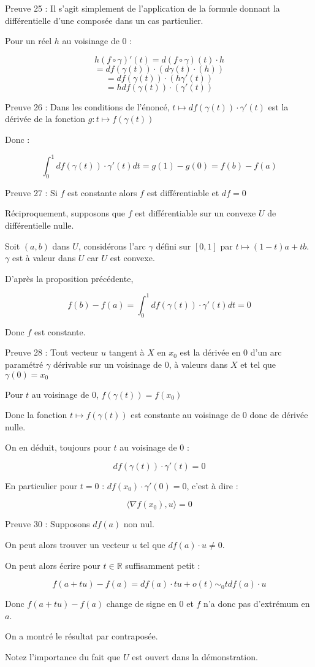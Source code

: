\documentclass[a4paper,12pt]{book}
\newcommand{\Pre}[1]{\begin{tcolorbox}[sharp corners, colback=white,colframe=green!60!green!30!black!75, title=Preuve]#1\end{tcolorbox}}
\def\R{\mathbb{R}}
\begin{document}
\Pre{Preuve 25 : Il s'agit simplement de l'application de la formule donnant la différentielle d'une composée dans un cas particulier.
\par Pour un réel $h$ au voisinage de $0$ :
\par $$h(f\circ\gamma)'(t)=d(f\circ\gamma)(t)\cdot h$$
$$= df(\gamma(t))\cdot (d\gamma(t)\cdot(h))$$
$$= df(\gamma(t))\cdot(h\gamma'(t))$$
$$= hdf(\gamma(t))\cdot(\gamma'(t))$$}
\Pre{Preuve 26 : Dans les conditions de l'énoncé, $t\mapsto df(\gamma(t))\cdot\gamma'(t)$ est la dérivée de la fonction $g :t\mapsto f(\gamma(t))$
\par Donc :
\par $$\int_0^1df(\gamma(t))\cdot\gamma'(t)dt = g(1)-g(0) = f(b)-f(a)$$}
\Pre{Preuve 27 : Si $f$ est constante alors $f$ est différentiable et $df=0$
\par Réciproquement, supposons que $f$ est différentiable sur un convexe $U$ de différentielle nulle.
\par Soit $(a,b)$ dans $U$, considérons l'arc $\gamma$ défini sur $[0,1]$ par $t\mapsto (1-t)a+tb$. $\gamma$ est à valeur dans $U$ car $U$ est convexe.
\par D'après la proposition précédente,
\par $$f(b)-f(a) = \int_0^1df(\gamma(t))\cdot\gamma'(t)dt=0$$
\par Donc $f$ est constante.}
\Pre{Preuve 28 : Tout vecteur $u$ tangent à $X$ en $x_0$ est la dérivée en $0$ d'un arc paramétré $\gamma$ dérivable sur un voisinage de $0$, à valeurs dans $X$ et tel que $\gamma(0)=x_0$
\par Pour $t$ au voisinage de $0$, $f(\gamma(t))=f(x_0)$
\par Donc la fonction $t\mapsto f(\gamma(t))$ est constante au voisinage de $0$ donc de dérivée nulle.
\par On en déduit, toujours pour $t$ au voisinage de $0$ :
\par $$df(\gamma(t))\cdot\gamma'(t)=0$$
\par En particulier pour $t=0$ : $df(x_0)\cdot \gamma'(0)=0$, c'est à dire :
\par $$\langle\nabla f(x_0), u\rangle=0$$}
\Pre{Preuve 30 : Supposons $df(a)$ non nul.
\par On peut alors trouver un vecteur $u$ tel que $df(a)\cdot u\neq 0$.
\par On peut alors écrire pour $t\in\R$ suffisamment petit :
\par $$f(a+tu) -f(a) = df(a)\cdot tu+o(t)\sim_0 tdf(a)\cdot u$$
\par Donc $f(a+tu)-f(a)$ change de signe en $0$ et $f$ n'a donc pas d'extrémum en $a$.
\par On a montré le résultat par contraposée.
\par Notez l'importance du fait que $U$ est ouvert dans la démonstration.}
\end{document}
